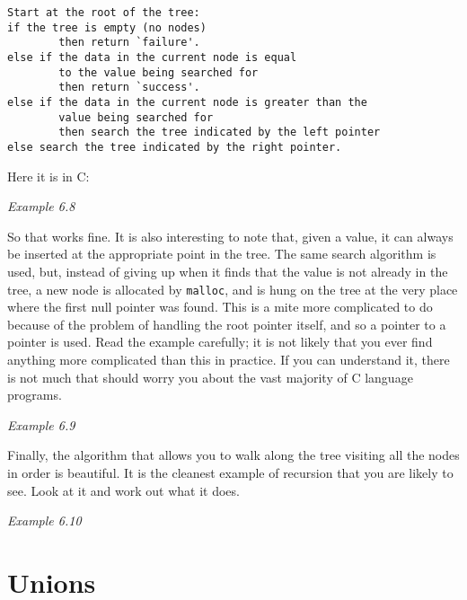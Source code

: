    \begin{Verbatim}
Start at the root of the tree:
if the tree is empty (no nodes)
        then return `failure'.
else if the data in the current node is equal
        to the value being searched for
        then return `success'.
else if the data in the current node is greater than the
        value being searched for
        then search the tree indicated by the left pointer
else search the tree indicated by the right pointer.
\end{Verbatim}

   Here it is in C:


   \begin{center}\textit{Example 6.8}\end{center}


   So that works fine. It is also interesting to note that, given a value,
    it can always be inserted at the appropriate point in the tree. The same
    search algorithm is used, but, instead of giving up when it finds that the
    value is not already in the tree, a new node is allocated by
    \texttt{malloc}, and is hung on the tree at the very place where the
    first null pointer was found. This is a mite more complicated to do because
    of the problem of handling the root pointer itself, and so a pointer to
    a pointer is used. Read the example carefully; it is not likely that you
    ever find anything more complicated than this in practice. If you can
    understand it, there is not much that should worry you about the vast
    majority of C language programs.


    \begin{center}\textit{Example 6.9}\end{center}


   Finally, the algorithm that allows you to walk along the tree visiting
    all the nodes in order is beautiful. It is the cleanest example of
    recursion that you are likely to see. Look at it and work out what it
    does.


    \begin{center}\textit{Example 6.10}\end{center}


  

 
        \section{Unions}
        

